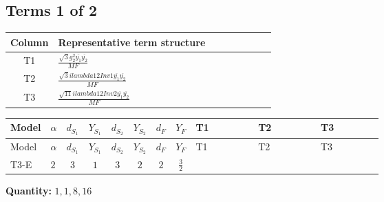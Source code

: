 \documentclass[8pt]{article}
\begin{document}
\begin{landscape}
\subsection*{Terms 1 of 2}
\begin{center}
\begin{tabular}{@{}c >{\raggedright\arraybackslash}p{0.82\linewidth}@{}}
\toprule
Column & Representative term structure \\
\midrule
T1 & \(\displaystyle \frac{\sqrt{3} g_{2}^{2} \overline{y_{1}} \overline{y_{2}}}{MF}\) \\
\midrule
T2 & \(\displaystyle \frac{\sqrt{3} i lambda12Inv1 \overline{y_{1}} \overline{y_{2}}}{MF}\) \\
\midrule
T3 & \(\displaystyle \frac{\sqrt{11} i lambda12Inv2 \overline{y_{1}} \overline{y_{2}}}{MF}\) \\
\midrule
\bottomrule
\end{tabular}
\end{center}
\smallskip
\tiny
\begin{longtable}{@{}llcccccc >{\raggedright\arraybackslash}p{0.21\linewidth} >{\raggedright\arraybackslash}p{0.21\linewidth} >{\raggedright\arraybackslash}p{0.21\linewidth}@{}}
\toprule
Model & $\alpha$ & $d_{S_1}$ & $Y_{S_1}$ & $d_{S_2}$ & $Y_{S_2}$ & $d_F$ & $Y_F$ & T1 & T2 & T3 \\
\midrule
\endfirsthead
\toprule
Model & $\alpha$ & $d_{S_1}$ & $Y_{S_1}$ & $d_{S_2}$ & $Y_{S_2}$ & $d_F$ & $Y_F$ & T1 & T2 & T3 \\
\midrule
\endhead
T3-E & $2$ & $3$ & $1$ & $3$ & $2$ & $2$ & $\frac{3}{2}$ & \scriptsize\adjustbox{max width=\linewidth}{$\begin{gathered} \frac{\sqrt{3} g_{2}^{2} \overline{y_{1}} \overline{y_{2}}}{6 MF}\end{gathered}$} & \scriptsize\adjustbox{max width=\linewidth}{$\begin{gathered} - \frac{\sqrt{3} i lambda12Inv1 \overline{y_{1}} \overline{y_{2}}}{6 MF}\end{gathered}$} & \scriptsize\adjustbox{max width=\linewidth}{$\begin{gathered} \frac{3 \sqrt{11} i lambda12Inv2 \overline{y_{1}} \overline{y_{2}}}{22 MF}\end{gathered}$} \\
\midrule
\bottomrule
\end{longtable}
\clearpage
\noindent\textbf{Quantity: }$\mathrm{1,1,8,16}$\par\smallskip

\end{landscape}
\end{document}
